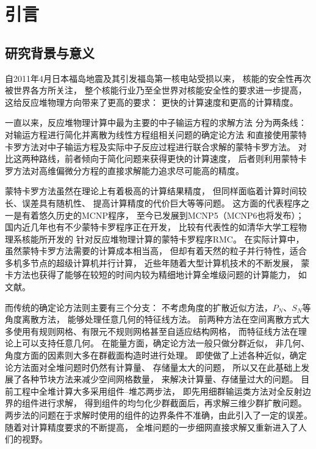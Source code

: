 
\chapter{引言}
\section{研究背景与意义}

自2011年4月日本福岛地震及其引发福岛第一核电站受损以来，
核能的安全性再次被世界各方所关注，
整个核能行业乃至全世界对核能安全性的要求进一步提高，
这给反应堆物理方向带来了更高的要求：
更快的计算速度和更高的计算精度。

一直以来，反应堆物理计算中最为主要的中子输运方程的求解方法
分为两条线：对输运方程进行简化并离散为线性方程组相关问题的确定论方法
和直接使用蒙特卡罗方法对中子输运方程及实际中子反应过程进行联合求解的蒙特卡罗方法。
对比这两种路线，前者倾向于简化问题来获得更快的计算速度，
后者则利用蒙特卡罗方法对高维偏微分方程的直接求解能力追求尽可能高的精度。

蒙特卡罗方法虽然在理论上有着极高的计算结果精度，
但同样面临着计算时间较长、误差具有随机性、
提高计算精度的代价巨大等等问题。
这方面的代表程序之一是有着悠久历史的MCNP程序\cite{forster2004mcnp}，
至今已发展到MCNP5（MCNP6也将发布）；
国内近几年也有不少蒙特卡罗程序正在开发，
比较有代表性的如清华大学工程物理系核能所开发的
针对反应堆物理计算的蒙特卡罗程序RMC\cite{li2010development}。
在实际计算中，虽然蒙特卡罗方法需要的计算成本相当高，
但却有着天然的粒子并行特性，适合多机多节点的超级计算机并行计算，
近些年随着大型计算机技术的不断发展，
蒙卡方法也获得了能够在较短的时间内较为精细地计算全堆级问题的计算能力，
如文献。

而传统的确定论方法则主要有三个分支：
不考虑角度的扩散近似方法，$P_N$、$S_N$等角度离散方法，
能够处理任意几何的特征线方法。
前两种方法在空间离散方式大多使用有规则网格、有限元不规则网格甚至自适应结构网格\cite{wang2009three}，
而特征线方法在理论上可以支持任意几何。
在能量方面，确定论方法一般只做分群近似，
非几何、角度方面的因素则大多在群截面构造时进行处理。
即使做了上述各种近似，确定论方法面对全堆问题时仍然有计算量、
存储量太大的问题\cite{azmy1997multiprocessing}，
所以又在此基础上发展了各种节块方法来减少空间网格数量，
来解决计算量、存储量过大的问题。
目前工程中全堆计算大多采用组件--堆芯两步法，
即先用细群输运类方法对全反射边界的组件进行求解，
得到组件的均匀化少群截面后，再求解三维少群扩散问题。
两步法的问题在于求解时使用的组件的边界条件不准确，由此引入了一定的误差。
随着对计算精度要求的不断提高，
全堆问题的一步细网直接求解又重新进入了人们的视野。


